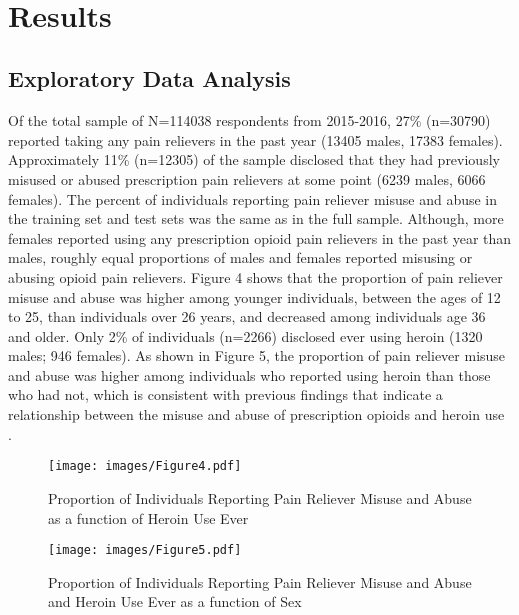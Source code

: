 \\\documentclass[sigconf]{acmart}
\begin{document}

\section{Results}

\subsection{Exploratory Data Analysis}

Of the total sample of N=114038 respondents from 2015-2016, 27\% (n=30790) 
reported taking any pain relievers in the past year (13405 males, 17383 
females). Approximately 11\% (n=12305) of the sample disclosed that they 
had previously misused or abused prescription pain relievers at some point 
(6239 males, 6066 females). The percent of individuals reporting pain reliever 
misuse and abuse in the training set and test sets was the same as in the 
full sample. Although, more females reported using any prescription opioid 
pain relievers in the past year than males, roughly equal proportions of 
males and females reported misusing or abusing opioid pain relievers. 
Figure 4 shows that the proportion of pain reliever misuse and abuse was 
higher among younger individuals, between the ages of 12 to 25, than 
individuals over 26 years, and decreased among individuals age 36 and older. 
Only 2\% of individuals (n=2266) disclosed ever using heroin (1320 males; 
946 females). As shown in Figure 5, the proportion of pain reliever misuse 
and abuse was higher among individuals who reported using heroin than those 
who had not, which is consistent with previous findings that indicate a 
relationship between the misuse and abuse of prescription opioids and 
heroin use \cite{muhuri13, unick13}.

\begin{figure}[!ht]
  \centering\texttt{[image: images/Figure4.pdf]}
  \caption{Proportion of Individuals Reporting Pain Reliever Misuse and Abuse
  as a function of Heroin Use Ever}
  \label{f:Figure4}
\end{figure}

\begin{figure}[!ht]
  \centering\texttt{[image: images/Figure5.pdf]}
  \caption{Proportion of Individuals Reporting Pain Reliever Misuse and Abuse
  and Heroin Use Ever as a function of Sex}
  \label{f:Figure5}
\end{figure}
 
\end{document}
